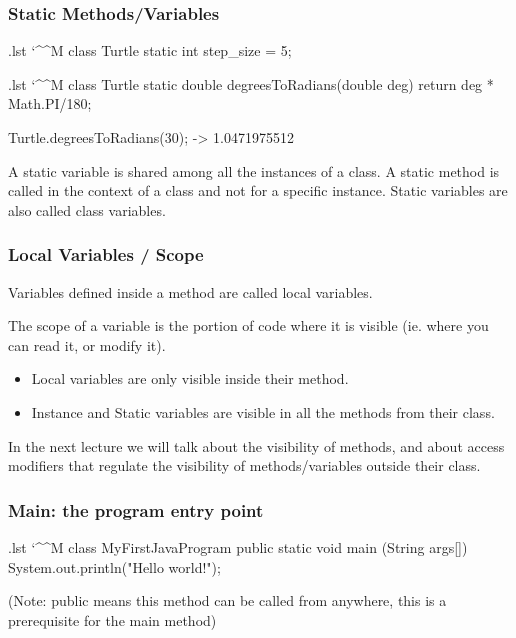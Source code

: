 \documentclass[10pt, handout]{beamer}
\makeatletter
\newenvironment{code}{%
  \begingroup
  \@bsphack
  \immediate\openout\lstvrb@out\jobname.lst
  \let\do\@makeother\dospecials\catcode`\^^M\active
  \def\verbatim@processline{%
    \immediate\write\lstvrb@out{\the\verbatim@line}}%
  \verbatim@start}{%
  \immediate\closeout\lstvrb@out
  \@esphack
  \endgroup

  \begin{alertblock}{}
    
  \end{alertblock}}
\makeatother
\begin{document}
\begin{frame}
  \frametitle{Static Methods/Variables}
    \begin{code}
class Turtle {
  static int step_size = 5;
}
    \end{code}
    \pause
    \begin{code}
class Turtle {
  static double degreesToRadians(double deg) {
    return deg * Math.PI/180;
  }
}

Turtle.degreesToRadians(30); -> 1.0471975512

    \end{code}
    \pause
    \begin{definition}
      A static variable is shared among all the instances of a class.
      A static method is called in the context of a class and not for a specific instance.
      Static variables are also called class variables.
    \end{definition}
\end{frame}

\begin{frame}
  \frametitle{Local Variables / Scope}
  \begin{definition}
    Variables defined inside a method are called local variables.

    The scope of a variable is the portion of code where it is visible (ie. where you can read it,
    or modify it).
   \end{definition}

    \begin{itemize}
      \item Local variables are only visible inside their method.
      \item Instance and Static variables are visible in all the methods from their class.
    \end{itemize}

    In the next lecture we will talk about the visibility of methods, and about access modifiers
    that regulate the visibility of methods/variables outside their class.
\end{frame}


\begin{frame}[fragile]
  \frametitle{Main: the program entry point}
  \begin{code}
    class MyFirstJavaProgram{
      public static void main (String args[]) {
        System.out.println("Hello world!");
      }
    }
  \end{code}
  (Note: public means this method can be called from anywhere, this is a prerequisite for
   the main method)
\end{frame}
\end{document}
